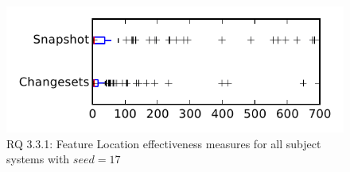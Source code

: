 
\begin{figure}
\centering
\includegraphics[height=0.4\textheight]{figures/flt_seed/rq1_tiny_17}
\caption{RQ 3.3.1: Feature Location effectiveness measures for all subject systems with $seed=17$}
\label{fig:flt_seed:rq1:tiny}
\end{figure}
